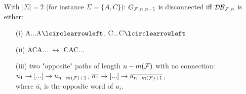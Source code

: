 \documentclass{article}
\begin{document}
\begin{result}
	With $|\Sigma| = 2$ (for instance $\Sigma = \{A, C\}$): $G_{\mathcal{F}, n, n-1}$ is disconnected iff $\mathcal{DB}_{\mathcal{F}, n}$ is either:
	\begin{itemize}
		\item[(i)] A...A$\lcirclearrowleft$, C...C$\lcirclearrowleft$
		\item[(ii)] ACA... $\leftrightarrow$ CAC...
		\item[(iii)] two "opposite" paths of length $n - m(\mathcal{F})$ with no connection: $u_1 \rightarrow [...] \rightarrow u_{n-m(\mathcal{F})+1}$, $\overline{u_1} \rightarrow [...] \rightarrow \overline{u_{n-m(\mathcal{F})+1}}$, \\
		where $\overline{u_i}$ is the opposite word of $u_i$.
	\end{itemize}
\end{result}
\end{document}

